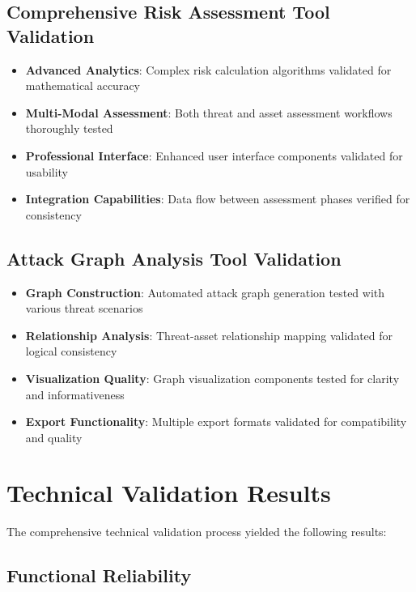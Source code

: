 \documentclass[binding=0.6cm]{sapthesis}
\begin{document}
\subsection{Comprehensive Risk Assessment Tool Validation}

\begin{itemize}
    \item \textbf{Advanced Analytics}: Complex risk calculation algorithms validated for mathematical accuracy
    \item \textbf{Multi-Modal Assessment}: Both threat and asset assessment workflows thoroughly tested
    \item \textbf{Professional Interface}: Enhanced user interface components validated for usability
    \item \textbf{Integration Capabilities}: Data flow between assessment phases verified for consistency
\end{itemize}

\subsection{Attack Graph Analysis Tool Validation}

\begin{itemize}
    \item \textbf{Graph Construction}: Automated attack graph generation tested with various threat scenarios
    \item \textbf{Relationship Analysis}: Threat-asset relationship mapping validated for logical consistency
    \item \textbf{Visualization Quality}: Graph visualization components tested for clarity and informativeness
    \item \textbf{Export Functionality}: Multiple export formats validated for compatibility and quality
\end{itemize}

\section{Technical Validation Results}

The comprehensive technical validation process yielded the following results:

\subsection{Functional Reliability}
\end{document}
